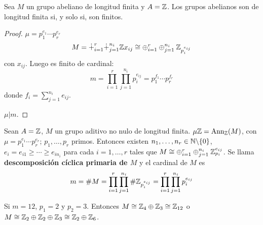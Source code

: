 \begin{obs}
  Sea \(M\) un grupo abeliano de longitud finita y \(A = \mathbb{Z}\).
  Los grupos abelianos son de longitud finita si, y solo si, son
  finitos.
\end{obs}
\begin{proof}
  \(\mu=p_1^{e_1}\cdots p_r^{e_r}\)
  \[
    M=\dot{+}_{i=1}^r\dot{+}_{j=1}^{n_i}\mathbb{Z} x_{ij}\cong
    \oplus_{i=1}^r\oplus_{j=1}^{n_i}\mathbb{Z}_{p_i^{e_{ij}}}
  \]
  con \(x_{ij}\). Luego es finito de cardinal:
  \[
    m=\prod_{i=1}^r\prod_{j=1}^{n_i} p_i^{e_{ij}}
    =p_1^{f_1}\cdots p_r^{f_r}
  \]
  donde \(f_i=\sum_{j=1}^{n_i} e_{ij}\).

  \(\mu| m\).

\end{proof}

\begin{ejemplo}
  Sean \(A = \mathbb{Z}\), \(M\) un grupo aditivo no nulo de longitud finita.
  \(\mu\mathbb{Z} = \operatorname{Ann}_{\mathbb{Z}}(M)\), con \(\mu = p_1^{e_1} \cdots p_r^{e_r}\); \(p_1, \ldots,
  p_r\) primos. Entonces existen \(n_1, \ldots, n_r \in \mathbb{N}\backslash\{0\}\),
  \(e_i = e_{i1} \ge \cdots \ge e_{in_i}\) para cada \(i = 1, \ldots, r\) tales que
  \(M \cong \oplus^r_{i=1} \oplus^{n_i}_{j = 1} \mathbb{Z}_{p_i}^{e_{ij}}\). Se llama
  \textbf{descomposición cíclica primaria de \(M\)} y el cardinal de \(M\) es
  \[
    m = \#M = \prod^r_{i=1}\prod^{n_i}_{j=1} \#\mathbb{Z}_{p_i^{e_{ij}}} =
    \prod^r_{i=1}\prod^{n_i}_{j=1} p_i^{e_{ij}}
  \]
\end{ejemplo}

\begin{ejemplo}
  Si \(m=12\), \(p_1=2\) y \(p_2=3\). Entonces \(M\cong \mathbb{Z}_4\oplus
  \mathbb{Z}_3\cong\mathbb{Z}_{12}\) o \(M\cong \mathbb{Z}_2\oplus
  \mathbb{Z}_2 \oplus \mathbb{Z}_3 \cong \mathbb{Z}_2 \oplus \mathbb{Z}_{6}\).
\end{ejemplo}

